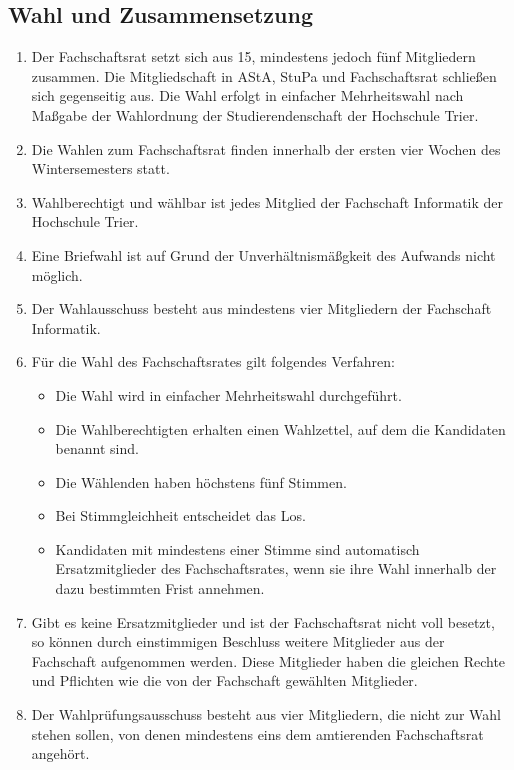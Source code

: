 \subsection{Wahl und Zusammensetzung}
\label{sec:zusammensetzung}
\begin{enumerate}
\item Der Fachschaftsrat setzt sich aus 15, mindestens jedoch fünf Mitgliedern zusammen. Die Mitgliedschaft in AStA, StuPa und Fachschaftsrat schließen sich gegenseitig aus. Die Wahl erfolgt in einfacher Mehrheitswahl nach Maßgabe der Wahlordnung der Studierendenschaft der Hochschule Trier.
\item Die Wahlen zum Fachschaftsrat finden innerhalb der ersten vier Wochen des Wintersemesters statt.
\item Wahlberechtigt und wählbar ist jedes Mitglied der Fachschaft Informatik der Hochschule Trier.
\item Eine Briefwahl ist auf Grund der Unverhältnismäßgkeit des Aufwands nicht möglich.
\item Der Wahlausschuss besteht aus mindestens vier Mitgliedern der Fachschaft Informatik.
\item Für die Wahl des Fachschaftsrates gilt folgendes Verfahren:
\begin{itemize}
\item Die Wahl wird in einfacher Mehrheitswahl durchgeführt.
\item Die Wahlberechtigten erhalten einen Wahlzettel, auf dem die Kandidaten benannt sind.
\item Die Wählenden haben höchstens fünf Stimmen.
\item Bei Stimmgleichheit entscheidet das Los.
\item Kandidaten mit mindestens einer Stimme sind automatisch Ersatzmitglieder des Fachschaftsrates, wenn sie ihre Wahl innerhalb der dazu bestimmten Frist annehmen.
\end{itemize}
\item \label{ersatz} Gibt es keine Ersatzmitglieder und ist der Fachschaftsrat nicht voll besetzt, so können durch einstimmigen Beschluss weitere Mitglieder aus der Fachschaft aufgenommen werden. Diese Mitglieder haben die gleichen Rechte und Pflichten wie die von der Fachschaft gewählten Mitglieder.
\item Der Wahlprüfungsausschuss besteht aus vier Mitgliedern, die nicht zur Wahl stehen sollen, von denen mindestens eins dem amtierenden Fachschaftsrat angehört.
\end{enumerate}

